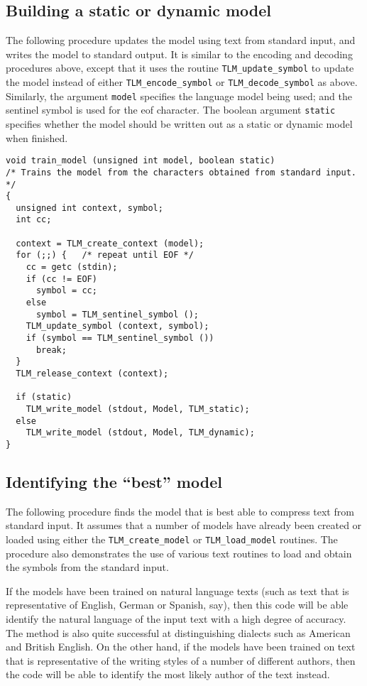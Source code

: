 \documentclass[11pt]{article}
\begin{document}
\subsection{Building a static or dynamic model }

The following procedure updates the model using text from standard input,
and writes the model to standard output. It is similar to the
encoding and decoding procedures above, except that it uses the routine
\verb|TLM_update_symbol| to update the model instead of either \verb|TLM_encode_symbol| or
\verb|TLM_decode_symbol| as above. Similarly, the argument \verb|model| specifies the language model
being used; and the sentinel symbol is used for the eof character. The boolean argument \verb|static| specifies
whether the model should be written out as a static or dynamic model when finished.

\begin{verbatim}
void train_model (unsigned int model, boolean static)
/* Trains the model from the characters obtained from standard input. */
{
  unsigned int context, symbol;
  int cc;

  context = TLM_create_context (model);
  for (;;) {   /* repeat until EOF */
    cc = getc (stdin);
    if (cc != EOF)
      symbol = cc;
    else
      symbol = TLM_sentinel_symbol ();
    TLM_update_symbol (context, symbol);
    if (symbol == TLM_sentinel_symbol ())
      break;
  }
  TLM_release_context (context);

  if (static)
    TLM_write_model (stdout, Model, TLM_static);
  else
    TLM_write_model (stdout, Model, TLM_dynamic);
}
\end{verbatim}

\subsection{Identifying the ``best'' model}

The following procedure finds the model that is best able
to compress text from standard input.
It assumes that a number of models have already been created or loaded
using either the \verb|TLM_create_model| or \verb|TLM_load_model| routines.
The procedure also demonstrates the use of various text routines to load
and obtain the symbols from the standard input.

If the models have been trained on natural language texts (such as text that is representative of
English, German or Spanish, say),
then this code will be able identify the natural language of the input text
with a high degree of accuracy. The method is also quite successful at distinguishing dialects such
as American and British English. On the other hand, if the models have been trained on text that
is representative of the writing styles of a number of different authors, then the code will be
able to identify the most likely author of the text instead.
\end{document}
